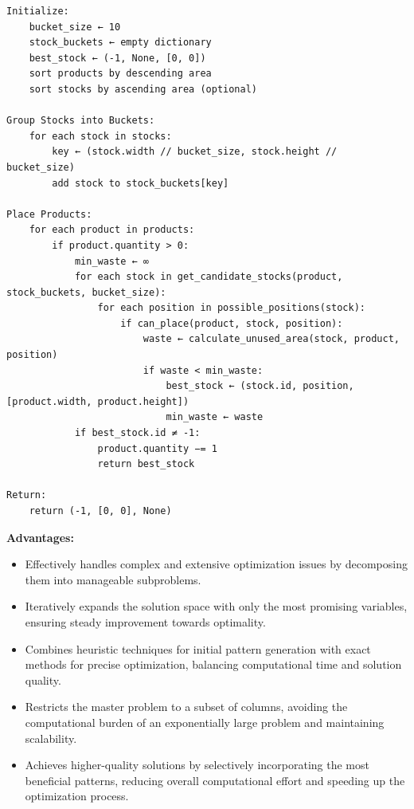 \documentclass[a4paper]{article}
\begin{document}
\begin{itemize}
\begin{itemize}
\begin{verbatim}
Initialize:
    bucket_size ← 10
    stock_buckets ← empty dictionary
    best_stock ← (-1, None, [0, 0])
    sort products by descending area
    sort stocks by ascending area (optional)

Group Stocks into Buckets:
    for each stock in stocks:
        key ← (stock.width // bucket_size, stock.height // bucket_size)
        add stock to stock_buckets[key]

Place Products:
    for each product in products:
        if product.quantity > 0:
            min_waste ← ∞
            for each stock in get_candidate_stocks(product, stock_buckets, bucket_size):
                for each position in possible_positions(stock):
                    if can_place(product, stock, position):
                        waste ← calculate_unused_area(stock, product, position)
                        if waste < min_waste:
                            best_stock ← (stock.id, position, [product.width, product.height])
                            min_waste ← waste
            if best_stock.id ≠ -1:
                product.quantity −= 1
                return best_stock

Return:
    return (-1, [0, 0], None)
\end{verbatim}
\end{itemize}
\end{itemize}


\vspace{0.25cm}
\noindent\textbf{Advantages:} 
\begin{itemize}
    \item Effectively handles complex and extensive optimization issues by decomposing them into manageable subproblems.
    \item Iteratively expands the solution space with only the most promising variables, ensuring steady improvement towards optimality.
    \item Combines heuristic techniques for initial pattern generation with exact methods for precise optimization, balancing computational time and solution quality.
    \item Restricts the master problem to a subset of columns, avoiding the computational burden of an exponentially large problem and maintaining scalability.
    \item Achieves higher-quality solutions by selectively incorporating the most beneficial patterns, reducing overall computational effort and speeding up the optimization process.
\end{itemize}
\end{document}
